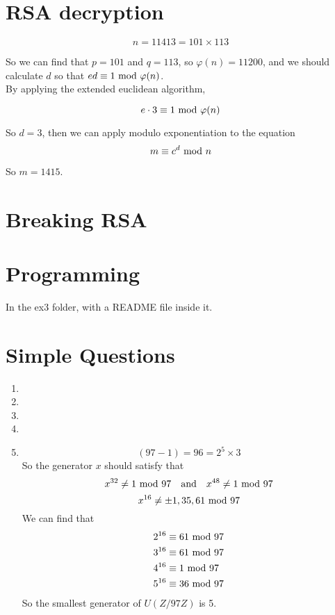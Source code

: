 \documentclass{article}
\renewcommand{\mod}{{\rm\ mod\ }}
\begin{document}
\section{RSA decryption}
$$n=11413=101\times113$$

So we can find that $p=101$ and $q=113$, so $\varphi(n)=11200$, and we should calculate $d$ so that $ed\equiv1\mod \varphi(n)$.\\[-0.5em]

By applying the extended euclidean algorithm,

$$e\cdot3\equiv1\mod \varphi(n)$$

So $d=3$, then we can apply modulo exponentiation to the equation
$$m\equiv c^d\mod n$$


So $m=1415$.

\section{Breaking RSA}

\section{Programming}
In the ex3 folder, with a README file inside it.

\section{Simple Questions}
\begin{enumerate}
\item
\item
\item
\item
\item
$$(97-1)=96=2^5\times3$$
So the generator $x$ should satisfy that 
$$x^{32}\neq 1\mod 97\quad{\rm and}\quad x^{48}\neq 1\mod 97$$
$$x^{16}\neq \pm 1,35,61\mod 97$$
We can find that
\begin{align*}
2^{16}&\equiv61\mod97\\
3^{16}&\equiv61\mod97\\
4^{16}&\equiv1\mod97\\
5^{16}&\equiv36\mod97
\end{align*}
So the smallest generator of $U(Z/97Z)$ is 5.
\end{enumerate}
\end{document}
